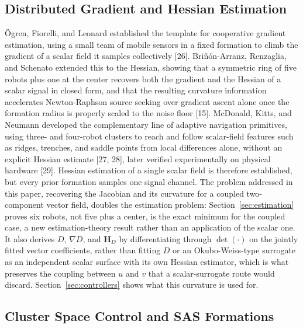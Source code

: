 \documentclass[lettersize,journal]{IEEEtran}
\begin{document}
\subsection{Distributed Gradient and Hessian Estimation}

Ögren, Fiorelli, and Leonard established the template for cooperative
gradient estimation, using a small team of mobile sensors in a fixed
formation to climb the gradient of a scalar field it samples collectively
[26]. Briñón-Arranz, Renzaglia, and Schenato extended this to the Hessian,
showing that a symmetric ring of five robots plus one at the center
recovers both the gradient and the Hessian of a scalar signal in closed
form, and that the resulting curvature information accelerates
Newton-Raphson source seeking over gradient ascent alone once the formation
radius is properly scaled to the noise floor [15]. McDonald, Kitts, and
Neumann developed the complementary line of adaptive navigation primitives,
using three- and four-robot clusters to reach and follow scalar-field
features such as ridges, trenches, and saddle points from local differences
alone, without an explicit Hessian estimate [27, 28], later verified
experimentally on physical hardware [29]. Hessian estimation of a
single scalar field is therefore established, but every prior formation
samples one signal channel. The problem addressed in this paper, recovering
the Jacobian and its curvature for a coupled two-component vector field,
doubles the estimation problem: Section~\ref{sec:estimation} proves six
robots, not five plus a center, is the exact minimum for the coupled case,
a new estimation-theory result rather than an application of the scalar
one. It also derives $D$, $\nabla D$, and $\mathbf{H}_D$ by differentiating
through $\det(\cdot)$ on the jointly fitted vector coefficients, rather than
fitting $D$ or an Okubo-Weiss-type surrogate as an independent scalar
surface with its own Hessian estimator, which is what preserves the
coupling between $u$ and $v$ that a scalar-surrogate route would discard.
Section~\ref{sec:controllers} shows what this curvature is used for.

\subsection{Cluster Space Control and SAS Formations}
\end{document}
